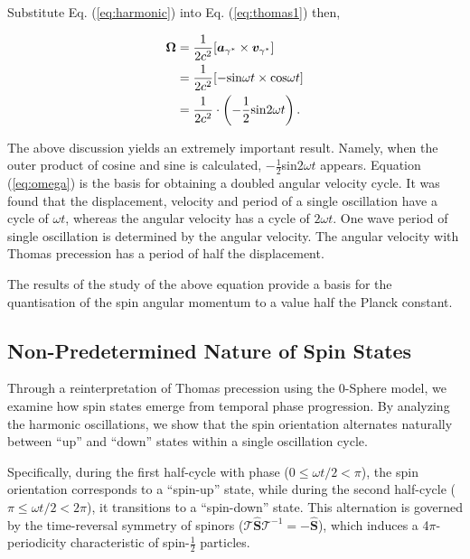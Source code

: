 \documentclass[%
 reprint,
 amsmath,amssymb,
 aps,
]{revtex4-1}
\numberwithin{equation}{section}%
\begin{document}
Substitute Eq. (\ref{eq:harmonic}) into Eq. (\ref{eq:thomas1}) then,

\begin{equation}
    \begin{split}
        {\bf \Omega} 
            &= \frac{1}{2 c^2}[{\boldsymbol a_{\gamma^{*}}} \times {\boldsymbol v_{\gamma^{*}}} ]  \\
            &= \frac{1}{2 c^2} [ -\mathrm{sin}\omega t \times \mathrm{cos}\omega t ] \\
            &= \frac{1}{2 c^2} \cdot \left( - \frac{1}{2} \mathrm{sin}2\omega t \right)
            .
    \label{eq:omega}
    \end{split}
\end{equation}

The above discussion yields an extremely important result. Namely, when the outer product of cosine and sine is calculated, $-\frac{1}{2}$sin$2\omega t$ appears. Equation (\ref{eq:omega}) is the basis for obtaining a doubled angular velocity cycle. It was found that the displacement, velocity and period of a single oscillation have a cycle of $\omega t$, whereas the angular velocity has a cycle of $2\omega t$. One wave period of single oscillation is determined by the angular velocity. The angular velocity with Thomas precession has a period of half the displacement.

The results of the study of the above equation provide a basis for the quantisation of the spin angular momentum to a value half the Planck constant.


\subsection{Non-Predetermined Nature of Spin States}

Through a reinterpretation of Thomas precession using the 0-Sphere model, we examine how spin states emerge from temporal phase progression. By analyzing the harmonic oscillations, we show that the spin orientation alternates naturally between ``up'' and ``down'' states within a single oscillation cycle.

Specifically, during the first half-cycle with phase (\( 0 \leq \omega t/2 < \pi \)), the spin orientation corresponds to a ``spin-up'' state, while during the second half-cycle (\( \pi \leq \omega t /2< 2\pi \)), it transitions to a ``spin-down'' state. This alternation is governed by the time-reversal symmetry of spinors ($\mathcal{T}\hat{\boldsymbol{S}}\mathcal{T}^{-1} = -\hat{\boldsymbol{S}}$), which induces a 4\(\pi\)-periodicity characteristic of spin-\( \frac{1}{2} \) particles. 
\end{document}
